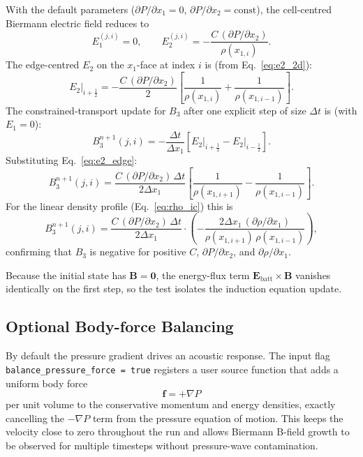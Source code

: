 \documentclass[11pt]{article}
\newcommand{\bv}[1]{\boldsymbol{#1}}
\newcommand{\grad}{\nabla}
\newcommand{\Ebatt}{\bv{E}_\mathrm{batt}}
\begin{document}
With the default parameters ($\partial P/\partial x_1 = 0$, $\partial P/\partial x_2 = \mathrm{const}$), the cell-centred Biermann electric field
reduces to
\begin{equation}
  E_1^{(j,i)} = 0, \qquad
  E_2^{(j,i)} = -\frac{C\,(\partial P/\partial x_2)}{\rho(x_{1,i})}.
  \label{eq:e_analytic}
\end{equation}
The edge-centred $E_2$ on the $x_1$-face at index $i$ is (from
Eq.~\ref{eq:e2_2d}):
\begin{equation}
  E_2\big|_{i+\frac{1}{2}}
    = -\frac{C\,(\partial P/\partial x_2)}{2}
      \left[\frac{1}{\rho(x_{1,i})} + \frac{1}{\rho(x_{1,i-1})}\right].
  \label{eq:e2_edge}
\end{equation}
The constrained-transport update for $B_3$ after one explicit step of
size $\Delta t$ is (with $E_1 = 0$):
\begin{equation}
  B_3^{n+1}(j,i)
    = -\frac{\Delta t}{\Delta x_1}
      \left[E_2\big|_{i+\frac{1}{2}} - E_2\big|_{i-\frac{1}{2}}\right].
  \label{eq:ct_update}
\end{equation}
Substituting Eq.~\eqref{eq:e2_edge}:
\begin{equation}
  B_3^{n+1}(j,i)
    = \frac{C\,(\partial P/\partial x_2)\,\Delta t}{2\Delta x_1}
      \left[
        \frac{1}{\rho(x_{1,i+1})} - \frac{1}{\rho(x_{1,i-1})}
      \right].
  \label{eq:bz_analytic}
\end{equation}
For the linear density profile (Eq.~\ref{eq:rho_ic}) this is
\begin{equation}
  B_3^{n+1}(j,i)
    = \frac{C\,(\partial P/\partial x_2)\,\Delta t}{2\Delta x_1}
      \cdot\left(-\frac{2\Delta x_1\,(\partial\rho/\partial x_1)}
                       {\rho(x_{1,i+1})\,\rho(x_{1,i-1})}\right),
  \label{eq:bz_analytic2}
\end{equation}
confirming that $B_3$ is negative for positive $C$, $\partial P/\partial x_2$,
and $\partial\rho/\partial x_1$.

Because the initial state has $\bv{B}=\bv{0}$, the energy-flux term
$\Ebatt\times\bv{B}$ vanishes identically on the first step, so the test
isolates the induction equation update.

\subsection{Optional Body-force Balancing}
\label{sec:body_force}

By default the pressure gradient drives an acoustic response.  The input flag
\texttt{balance\_pressure\_force = true} registers a user source function that
adds a uniform body force
\begin{equation}
  \bv{f} = +\grad P
\end{equation}
per unit volume to the conservative momentum and energy densities,
exactly cancelling the $-\grad P$ term from the pressure equation of motion.
This keeps the velocity close to zero throughout the run and allows Biermann
B-field growth to be observed for multiple timesteps without pressure-wave
contamination.
\end{document}
